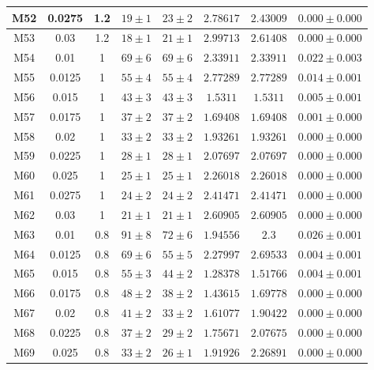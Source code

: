 \documentclass[12pt,a4paper]{report}
\begin{document}
\begin{center}
\begin{longtable}{||c|c|c|c|c|c|c|c||}
M52 & 0.0275 & 1.2 & $ 19 \pm 1 $ & $ 23 \pm 2 $ & $ 2.78617 $ & $ 2.43009 $ & $ 0.000 \pm 0.000 $ \\ \hline
M53 & 0.03 & 1.2 & $ 18 \pm 1 $ & $ 21 \pm 1 $ & $ 2.99713 $ & $ 2.61408 $ & $ 0.000 \pm 0.000 $ \\ \hline
M54 & 0.01 & 1 & $ 69 \pm 6 $ & $ 69 \pm 6 $ & $ 2.33911 $ & $ 2.33911 $ & $ 0.022 \pm 0.003 $ \\ \hline
M55 & 0.0125 & 1 & $ 55 \pm 4 $ & $ 55 \pm 4 $ & $ 2.77289 $ & $ 2.77289 $ & $ 0.014 \pm 0.001 $ \\ \hline
M56 & 0.015 & 1 & $ 43 \pm 3 $ & $ 43 \pm 3 $ & $ 1.5311 $ & $ 1.5311 $ & $ 0.005 \pm 0.001 $ \\ \hline
M57 & 0.0175 & 1 & $ 37 \pm 2 $ & $ 37 \pm 2 $ & $ 1.69408 $ & $ 1.69408 $ & $ 0.001 \pm 0.000 $ \\ \hline
M58 & 0.02 & 1 & $ 33 \pm 2 $ & $ 33 \pm 2 $ & $ 1.93261 $ & $ 1.93261 $ & $ 0.000 \pm 0.000 $ \\ \hline
M59 & 0.0225 & 1 & $ 28 \pm 1 $ & $ 28 \pm 1 $ & $ 2.07697 $ & $ 2.07697 $ & $ 0.000 \pm 0.000 $ \\ \hline
M60 & 0.025 & 1 & $ 25 \pm 1 $ & $ 25 \pm 1 $ & $ 2.26018 $ & $ 2.26018 $ & $ 0.000 \pm 0.000 $ \\ \hline
M61 & 0.0275 & 1 & $ 24 \pm 2 $ & $ 24 \pm 2 $ & $ 2.41471 $ & $ 2.41471 $ & $ 0.000 \pm 0.000 $ \\ \hline
M62 & 0.03 & 1 & $ 21 \pm 1 $ & $ 21 \pm 1 $ & $ 2.60905 $ & $ 2.60905 $ & $ 0.000 \pm 0.000 $ \\ \hline
M63 & 0.01 & 0.8 & $ 91 \pm 8 $ & $ 72 \pm 6 $ & $ 1.94556 $ & $ 2.3 $ & $ 0.026 \pm 0.001 $ \\ \hline
M64 & 0.0125 & 0.8 & $ 69 \pm 6 $ & $ 55 \pm 5 $ & $ 2.27997 $ & $ 2.69533 $ & $ 0.004 \pm 0.001 $ \\ \hline
M65 & 0.015 & 0.8 & $ 55 \pm 3 $ & $ 44 \pm 2 $ & $ 1.28378 $ & $ 1.51766 $ & $ 0.004 \pm 0.001 $ \\ \hline
M66 & 0.0175 & 0.8 & $ 48 \pm 2 $ & $ 38 \pm 2 $ & $ 1.43615 $ & $ 1.69778 $ & $ 0.000 \pm 0.000 $ \\ \hline
M67 & 0.02 & 0.8 & $ 41 \pm 2 $ & $ 33 \pm 2 $ & $ 1.61077 $ & $ 1.90422 $ & $ 0.000 \pm 0.000 $ \\ \hline
M68 & 0.0225 & 0.8 & $ 37 \pm 2 $ & $ 29 \pm 2 $ & $ 1.75671 $ & $ 2.07675 $ & $ 0.000 \pm 0.000 $ \\ \hline
M69 & 0.025 & 0.8 & $ 33 \pm 2 $ & $ 26 \pm 1 $ & $ 1.91926 $ & $ 2.26891 $ & $ 0.000 \pm 0.000 $ \\ \hline

\end{longtable}
\end{center}
\end{document}

